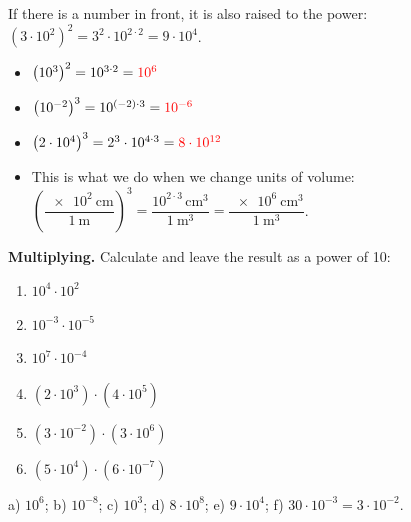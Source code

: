 If there is a number in front, it is also raised to the power: \(\left(3 \cdot 10^{2}\right)^{2} = 3^{2} \cdot 10^{2 \cdot 2} = 9 \cdot 10^{4}\).

\begin{example}
    \begin{itemize}
        \item \(\left(10^{3}\right)^{2} = 10^{3 \cdot 2} = \textcolor{red}{10^{6}}\)
        \item \(\left(10^{-2}\right)^{3} = 10^{(-2) \cdot 3} = \textcolor{red}{10^{-6}}\)
        \item \(\left(2 \cdot 10^{4}\right)^{3} = 2^{3} \cdot 10^{4 \cdot 3} = \textcolor{red}{8 \cdot 10^{12}}\)
        \item This is what we do when we change units of volume: \(\left(\dfrac{\qty{e2}{\cm}}{\qty{1}{\m}}\right)^{3} = \dfrac{10^{2 \cdot 3}\,\unit{\cubic\cm}}{\qty{1}{\cubic\m}} = \dfrac{\qty{e6}{\cubic\cm}}{\qty{1}{\cubic\m}}\).
    \end{itemize}
\end{example}

\begin{exercise}
    \textbf{Multiplying.} Calculate and leave the result as a power of 10:
    \begin{enumerate}[label=\letraminuscula]
        \item \(10^{4} \cdot 10^{2}\)
        \item \(10^{-3} \cdot 10^{-5}\)
        \item \(10^{7} \cdot 10^{-4}\)
        \item \((2 \cdot 10^{3}) \cdot (4 \cdot 10^{5})\)
        \item \((3 \cdot 10^{-2}) \cdot (3 \cdot 10^{6})\)
        \item \((5 \cdot 10^{4}) \cdot (6 \cdot 10^{-7})\)
    \end{enumerate}
    \begin{solu}
        a) \(10^{6}\); b) \(10^{-8}\); c) \(10^{3}\); d) \(8 \cdot 10^{8}\); e) \(9 \cdot 10^{4}\); f) \(30 \cdot 10^{-3} = 3 \cdot 10^{-2}\).
    \end{solu}
\end{exercise}

